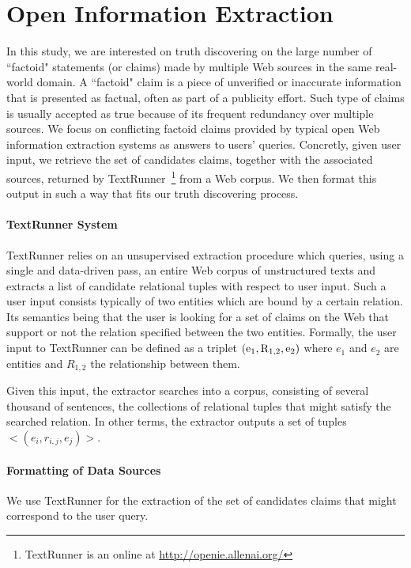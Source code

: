 \section{Open Information Extraction}

In this study, we are interested on truth discovering on the large number of ``factoid" statements
(or claims) made by multiple Web sources in the same real-world domain. A ``factoid" claim is
a piece of unverified or inaccurate information that is presented as factual, often
as part of a publicity effort. Such type of claims  is usually accepted as true  because of its
frequent redundancy over multiple sources. We focus on conflicting factoid claims provided by typical 
open Web information extraction systems as answers to users' queries. Concretly, given user input, 
we retrieve the set of candidates claims, together with the associated sources, returned by TextRunner~\footnote{TextRunner is an online
at \href{http://openie.allenai.org/}{http://openie.allenai.org/}}
from a Web corpus. We then format this output in such a way that fits our truth discovering process.



\paragraph*{TextRunner System}
TextRunner relies on an unsupervised extraction procedure which queries, using a single and data-driven 
pass, an entire Web corpus of unstructured texts and extracts a list of candidate relational tuples with 
respect to user input. Such a user input consists typically of two entities which are bound by a certain 
relation. Its semantics being that the user is looking for a set of claims on the Web that support or not
the relation specified between the two entities. Formally, the user input to TextRunner can be defined as a
triplet $(\mathrm{e_{1}}, \mathrm{R_{1,2}}, \mathrm{e_{2}})$ where $e_1$ and $e_2$ are entities and $R_{1,2}$ the relationship between them.

Given this input, the extractor searches into a corpus, consisting
of several thousand of sentences, the collections of relational tuples that might satisfy the searched relation.
In other terms, the extractor outputs a set of tuples $<(e_i, r_{i,j}, e_j)>$.

\paragraph*{Formatting of Data Sources}
We use TextRunner for the extraction of the set of 
candidates claims that might correspond to the user query.